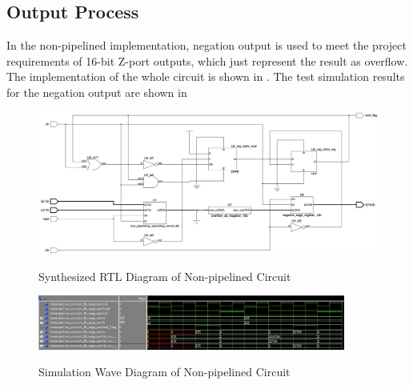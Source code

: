 \subsection{Output Process}

In the non-pipelined implementation, negation output is used to meet the project requirements of 16-bit Z-port outputs,
which just represent the result as overflow.
The implementation of the whole circuit is shown in .
The test simulation results for the negation output are shown in 

\begin{figure}[!htp]
	\centering
	\caption{Synthesized RTL Diagram of Non-pipelined Circuit}
	\includegraphics[width=\textwidth]{../img/non_p_rtl.png}
	\label{fig:non_p_rtl}
\end{figure}

\begin{figure}[!htp]
	\centering
	\caption{Simulation Wave Diagram of Non-pipelined Circuit}
	\includegraphics[width=0.9\textwidth]{../img/non_p_sim.png}
	\label{fig:non_p_sim}
\end{figure}
